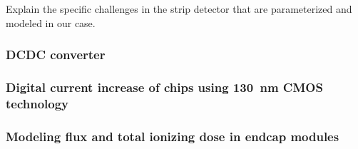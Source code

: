 
Explain the specific challenges in the strip detector that are parameterized and modeled
in our case.

\subsubsection{DCDC converter}

\subsubsection{Digital current increase of chips using 130~nm CMOS technology}

\subsubsection{Modeling flux and total ionizing dose in endcap modules}

